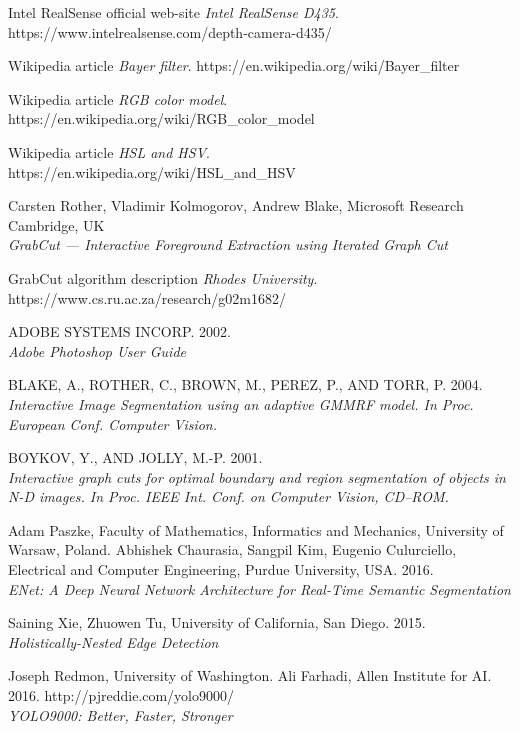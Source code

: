 \documentclass{ctuthesis}
\begin{document}
\begin{thebibliography}{9}

Intel RealSense official web-site
\textit{Intel RealSense D435}. 
https://www.intelrealsense.com/depth-camera-d435/


Wikipedia article 
\textit{Bayer filter}. 
https://en.wikipedia.org/wiki/Bayer\_filter

Wikipedia article 
\textit{RGB color model}. 
https://en.wikipedia.org/wiki/RGB\_color\_model

Wikipedia article 
\textit{HSL and HSV}. 
\\https://en.wikipedia.org/wiki/HSL\_and\_HSV

Carsten Rother, Vladimir Kolmogorov, Andrew Blake, Microsoft Research Cambridge, UK
\\\textit{GrabCut — Interactive Foreground Extraction using Iterated Graph Cut}

GrabCut algorithm description
\textit{Rhodes University}. 
https://www.cs.ru.ac.za/research/g02m1682/

ADOBE SYSTEMS INCORP. 2002.
\\\textit{Adobe Photoshop User Guide}

BLAKE, A., ROTHER, C., BROWN, M., PEREZ, P., AND TORR, P. 2004.
\\\textit{Interactive Image Segmentation using an adaptive GMMRF model. In Proc. European Conf. Computer Vision.}

BOYKOV, Y., AND JOLLY, M.-P. 2001.
\\\textit{Interactive graph cuts for optimal boundary and region segmentation of objects in N-D images. In Proc. IEEE Int. Conf. on Computer Vision, CD–ROM.}

Adam Paszke, Faculty of Mathematics, Informatics and Mechanics, University of Warsaw, Poland. Abhishek Chaurasia, Sangpil Kim, Eugenio Culurciello, Electrical and Computer Engineering, Purdue University, USA. 2016.
\\\textit{ENet: A Deep Neural Network Architecture for Real-Time Semantic Segmentation}

Saining Xie, Zhuowen Tu, University of California, San Diego. 2015.
\\\textit{Holistically-Nested Edge Detection}

Joseph Redmon, University of Washington. Ali Farhadi, Allen Institute for AI. 2016. http://pjreddie.com/yolo9000/
\\\textit{YOLO9000: Better, Faster, Stronger}


\end{thebibliography}
\end{document}
